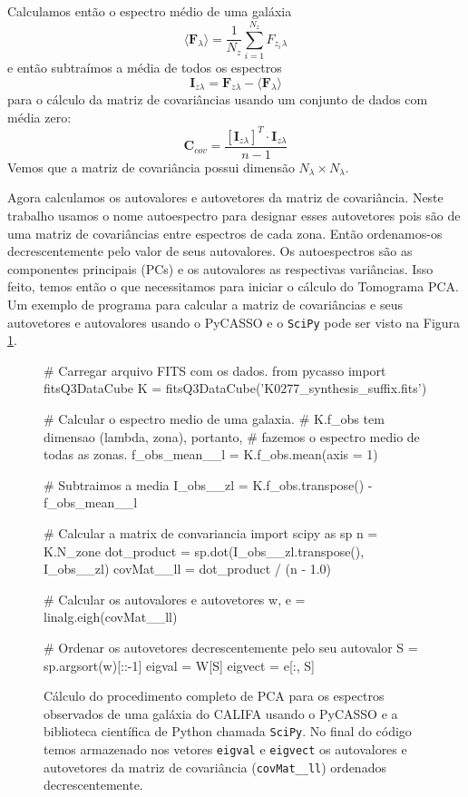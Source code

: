 Calculamos então o espectro médio de uma galáxia
\begin{equation}
\langle \textbf{F}{}_\lambda \rangle = \frac{1}{N_z} \sum_{i=1}^{N_z} F_{z_i}{}_{\lambda}
\end{equation}
\noindent e então subtraímos a média de todos os espectros
\begin{equation}
\textbf{I}{}_{z \lambda} = \textbf{F}{}_{z \lambda} - \langle \textbf{F}{}_\lambda \rangle
\end{equation}
\noindent para o cálculo da matriz de covariâncias usando um conjunto de dados com média zero:
\begin{equation}
	\label{eq:PCA:covMatrix}
	\mathbf{C}{}_{cov} = \frac{[\mathbf{I}{}_{z \lambda}]^T \cdot \mathbf{I}{}_{z \lambda}}{n - 1}
\end{equation}
\noindent Vemos que a matriz de covariância possui dimensão $N_\lambda \times N_\lambda$.

Agora calculamos os autovalores e autovetores da matriz de covariância. Neste trabalho usamos o nome autoespectro para
designar esses autovetores pois são de uma matriz de covariâncias entre espectros de cada zona. Então ordenamos-os
decrescentemente pelo valor de seus autovalores. Os autoespectros são as componentes principais (PCs) e os autovalores
as respectivas variâncias. Isso feito, temos então o que necessitamos para iniciar o cálculo do Tomograma PCA. Um
exemplo de programa para calcular a matriz de covariâncias e seus autovetores e autovalores usando o PyCASSO e o
\texttt{SciPy} pode ser visto na Figura \ref{fig:programaCovMatrix}.

\begin{figure}
	\begin{python}
# Carregar arquivo FITS com os dados.
from pycasso import fitsQ3DataCube
K = fitsQ3DataCube('K0277_synthesis_suffix.fits')

# Calcular o espectro medio de uma galaxia. 
# K.f_obs tem dimensao (lambda, zona), portanto, 
# fazemos o espectro medio de todas as zonas.
f_obs_mean__l = K.f_obs.mean(axis = 1)

# Subtraimos a media
I_obs__zl = K.f_obs.transpose() - f_obs_mean__l

# Calcular a matrix de convariancia
import scipy as sp
n = K.N_zone
dot_product = sp.dot(I_obs__zl.transpose(), I_obs__zl)
covMat__ll = dot_product / (n - 1.0)   

# Calcular os autovalores e autovetores
w, e = linalg.eigh(covMat__ll)

# Ordenar os autovetores decrescentemente pelo seu autovalor
S = sp.argsort(w)[::-1]
eigval = W[S]
eigvect = e[:, S]
	\end{python}
	\caption[Exemplo de cálculo de PCA usando o PyCASSO e SciPy.] 
	{Cálculo do procedimento completo de PCA para os espectros observados de uma galáxia do CALIFA usando o PyCASSO e a
	biblioteca científica de Python chamada \texttt{SciPy}. No final do código temos armazenado nos vetores \texttt{eigval}
	e \texttt{eigvect} os autovalores e autovetores da matriz de covariância (\texttt{covMat\_\_ll}) ordenados
	decrescentemente.}
	\label{fig:programaCovMatrix}
\end{figure}

